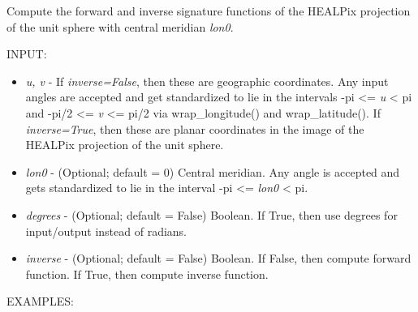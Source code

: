 \documentclass[a4paper,12ptopenany,oneside]{sphinxmanual}
\begin{document}

\begin{fulllineitems}
\label{projections:projections.healpix_sphere}
Compute the forward and inverse signature functions of the HEALPix 
projection of the unit sphere with central meridian \emph{lon0}.

INPUT:
\begin{itemize}
\item {} 
\emph{u, v} - If \emph{inverse=False}, then these are geographic coordinates.
Any input angles are accepted and get standardized to lie in the 
intervals -pi \textless{}= \emph{u} \textless{} pi and -pi/2 \textless{}= \emph{v} \textless{}= pi/2 
via wrap\_longitude() and wrap\_latitude().
If \emph{inverse=True}, then these are planar coordinates in the image
of the HEALPix projection of the unit sphere.

\item {} 
\emph{lon0} - (Optional; default = 0) Central meridian. Any angle is accepted
and gets standardized to lie in the interval -pi \textless{}= \emph{lon0} \textless{} pi.

\item {} 
\emph{degrees} - (Optional; default = False) Boolean. If True, then use 
degrees for input/output instead of radians.

\item {} 
\emph{inverse} - (Optional; default = False) Boolean. If False, then compute
forward function. If True, then compute inverse function.

\end{itemize}

EXAMPLES:


\end{fulllineitems}
\end{document}
